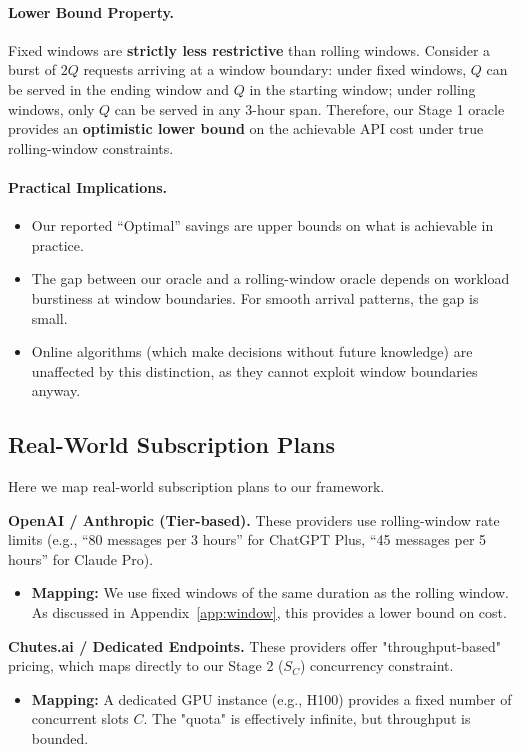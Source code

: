 \paragraph{Lower Bound Property.}
Fixed windows are \textbf{strictly less restrictive} than rolling windows. Consider a burst of $2Q$ requests arriving at a window boundary: under fixed windows, $Q$ can be served in the ending window and $Q$ in the starting window; under rolling windows, only $Q$ can be served in any 3-hour span. Therefore, our Stage 1 oracle provides an \textbf{optimistic lower bound} on the achievable API cost under true rolling-window constraints.

\paragraph{Practical Implications.}
\begin{itemize}
    \item Our reported ``Optimal'' savings are upper bounds on what is achievable in practice.
    \item The gap between our oracle and a rolling-window oracle depends on workload burstiness at window boundaries. For smooth arrival patterns, the gap is small.
    \item Online algorithms (which make decisions without future knowledge) are unaffected by this distinction, as they cannot exploit window boundaries anyway.
\end{itemize}

\subsection{Real-World Subscription Plans}
\label{app:plans}

Here we map real-world subscription plans to our framework.

\textbf{OpenAI / Anthropic (Tier-based).} These providers use rolling-window rate limits (e.g., ``80 messages per 3 hours'' for ChatGPT Plus, ``45 messages per 5 hours'' for Claude Pro).
\begin{itemize}
    \item \textbf{Mapping:} We use fixed windows of the same duration as the rolling window. As discussed in Appendix~\ref{app:window}, this provides a lower bound on cost.
\end{itemize}

\textbf{Chutes.ai / Dedicated Endpoints.} These providers offer "throughput-based" pricing, which maps directly to our Stage 2 ($S_C$) concurrency constraint.
\begin{itemize}
    \item \textbf{Mapping:} A dedicated GPU instance (e.g., H100) provides a fixed number of concurrent slots $C$. The "quota" is effectively infinite, but throughput is bounded.
\end{itemize}

